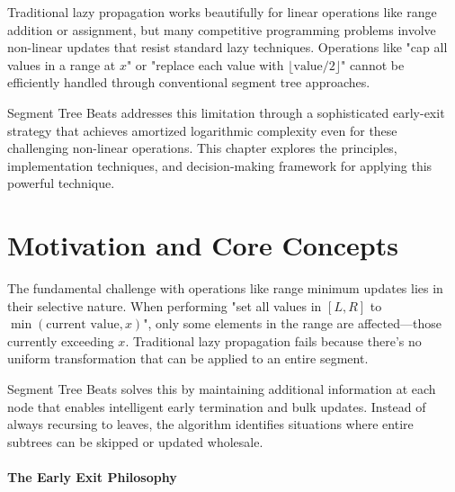 \label{chap:segment_tree_beats}

Traditional lazy propagation works beautifully for linear operations like range addition or assignment, but many competitive programming problems involve non-linear updates that resist standard lazy techniques. Operations like "cap all values in a range at $x$" or "replace each value with $\lfloor\text{value}/2\rfloor$" cannot be efficiently handled through conventional segment tree approaches.

Segment Tree Beats addresses this limitation through a sophisticated early-exit strategy that achieves amortized logarithmic complexity even for these challenging non-linear operations. This chapter explores the principles, implementation techniques, and decision-making framework for applying this powerful technique.

\section{Motivation and Core Concepts}
\label{sec:beats_motivation}

The fundamental challenge with operations like range minimum updates lies in their selective nature. When performing "set all values in $[L,R]$ to $\min(\text{current value}, x)$", only some elements in the range are affected—those currently exceeding $x$. Traditional lazy propagation fails because there's no uniform transformation that can be applied to an entire segment.

Segment Tree Beats solves this by maintaining additional information at each node that enables intelligent early termination and bulk updates. Instead of always recursing to leaves, the algorithm identifies situations where entire subtrees can be skipped or updated wholesale.


\paragraph{The Early Exit Philosophy}

